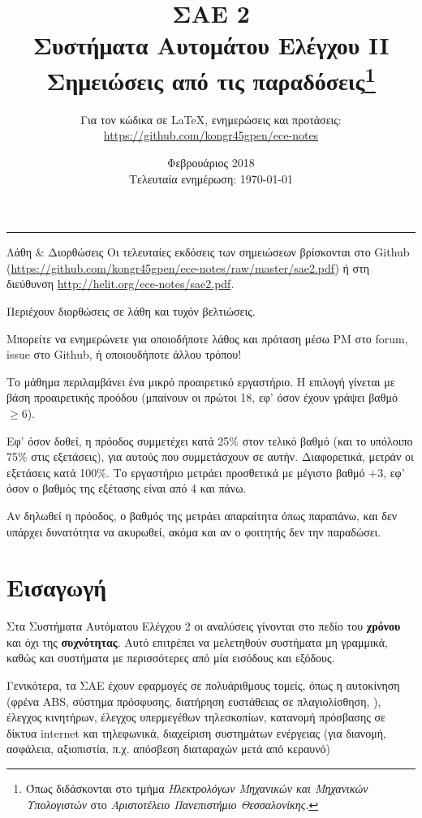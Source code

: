 \documentclass[11pt,a4paper,notitlepage,fleqn]{article}
\title{ΣΑΕ 2
	\\
	{
		\normalsize Συστήματα Αυτομάτου Ελέγχου II
		\\
		\normalsize Σημειώσεις από τις παραδόσεις\footnote{Όπως διδάσκονται στο τμήμα \textit{Ηλεκτρολόγων Μηχανικών και Μηχανικών Υπολογιστών} στο \textit{Αριστοτέλειο Πανεπιστήμιο Θεσσαλονίκης}.}
	}}
\date{Φεβρουάριος 2018
	\\
	{
		\small Τελευταία ενημέρωση: \today
	}
}
\author{
	Για τον κώδικα σε \LaTeX, ενημερώσεις και προτάσεις:
	\\
	\url{https://github.com/kongr45gpen/ece-notes}}
\begin{document}
\maketitle

\hrule
\vspace{50pt}

\begin{infobox}{Λάθη \& Διορθώσεις}
	Οι τελευταίες εκδόσεις των σημειώσεων βρίσκονται στο Github
	(\url{https://github.com/kongr45gpen/ece-notes/raw/master/sae2.pdf}) ή
	στη διεύθυνση \url{http://helit.org/ece-notes/sae2.pdf}.

	Περιέχουν διορθώσεις σε λάθη και τυχόν βελτιώσεις.

	\tcblower

	Μπορείτε να ενημερώνετε για οποιοδήποτε λάθος και πρόταση
	μέσω PM στο forum, issue στο Github, ή οποιουδήποτε άλλου τρόπου!
\end{infobox}

Το μάθημα περιλαμβάνει ένα μικρό προαιρετικό εργαστήριο. Η επιλογή γίνεται με βάση
προαιρετικής προόδου (μπαίνουν οι πρώτοι 18, εφ' όσον έχουν γράψει βαθμό \( \geq 6 \)).

Εφ' όσον δοθεί, η πρόοδος συμμετέχει κατά 25\% στον τελικό βαθμό
(και το υπόλοιπο 75\% στις εξετάσεις), για αυτούς που συμμετάσχουν
σε αυτήν. Διαφορετικά, μετράν οι εξετάσεις κατά 100\%. Το εργαστήριο μετράει προσθετικά
με μέγιστο βαθμό \( +3 \), εφ' όσον ο βαθμός της εξέτασης είναι από 4 και πάνω.

Αν δηλωθεί η πρόοδος, ο βαθμός της μετράει απαραίτητα όπως παραπάνω, και δεν υπάρχει δυνατότητα να
ακυρωθεί, ακόμα και αν ο φοιτητής δεν την παραδώσει.

\newpage

{
\hypersetup{linkcolor=black}
\listoflecture
\tableofcontents
}

\newpage
{}
\section{Εισαγωγή}
Στα Συστήματα Αυτόματου Ελέγχου 2 οι αναλύσεις γίνονται στο πεδίο του \textbf{χρόνου}
και όχι της \textbf{συχνότητας}. Αυτό επιτρέπει να μελετηθούν συστήματα μη γραμμικά,
καθώς και συστήματα με περισσότερες από μία εισόδους και εξόδους.

Γενικότερα, τα ΣΑΕ έχουν εφαρμογές σε πολυάριθμους τομείς, όπως η αυτοκίνηση (φρένα
ABS, σύστημα πρόσφυσης, διατήρηση ευστάθειας σε πλαγιολίσθηση, \textellipsis), έλεγχος
κινητήρων, έλεγχος υπερμεγέθων τηλεσκοπίων, κατανομή πρόσβασης σε δίκτυα internet και
τηλεφωνικά, διαχείριση συστημάτων ενέργειας (για διανομή, ασφάλεια, αξιοπιστία, π.χ.
απόσβεση διαταραχών μετά από κεραυνό)\textellipsis
\end{document}
